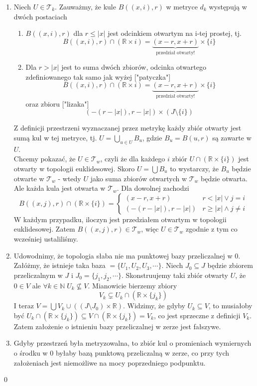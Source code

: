 \documentclass{article}
\theoremstyle{definition}%
\theoremstyle{theorem}
\renewenvironment{proof}{{\bfseries Rozwiązanie}}{\qed}
\newcommand{\R}{\mathbb{R}} %
\newcommand{\sT}{\mathcal{T}} %
\begin{document}
		 \begin{proof}
		 	\begin{enumerate}
		 		\item Niech $U \in \sT_k$. Zauważmy, że kule $B((x,i),r)$ w metryce $d_k$ występują w dwóch postaciach
		 		\begin{enumerate}
		 			\item $B((x,i),r)$ dla $r\leq|x|$ jest odcinkiem otwartym na i-tej prostej, tj. \[
		 			B((x,i),r) \cap \left(\R \times {i}\right) = \underbrace{(x-r,x+r)}_{\text{przedział otwarty!}} \times \{i\}\]
		 			\item Dla $r > |x|$ jest to suma dwóch zbiorów, odcinka otwartego zdefiniowanego tak samo jak wyżej ["patyczka"] 
		 			\[
		 			B((x,i),r) \cap \left(\R \times {i}\right) = \underbrace{(x-r,x+r)}_{\text{przedział otwarty!}} \times \{i\}\]
		 			oraz zbioru ["lizaka"]
		 			\[
		 			(-(r-|x|),r-|x|)\times \left(J \setminus \{i\}\right)
		 			\]
		 		\end{enumerate}
		 		Z definicji przestrzeni wyznaczanej przez metrykę każdy zbiór otwarty jest sumą kul w tej metryce, tj. $U=\bigcup_{u\in U } B_u$, gdzie $B_u = B(u,r)$ są zawarte w $U$. \\
		 		Chcemy pokazać, że $U\in \sT_w$, czyli że dla każdego $i$ zbiór $U\cap \left( \R\times\{i\}\right)$ jest otwarty w topologii euklidesowej. Skoro $U = \bigcup B_u$ to wystarczy, że $B_u$ będzie otwarte w $\sT_w$ - wtedy $U$ jako suma zbiorów otwartych w $\sT_w$ będzie otwarta. \\
		 		Ale każda kula jest otwarta w $\sT_w$. Dla dowolnej zachodzi 
		 		\[
		 		B((x,j),r) \cap \left(\R \times \{i\}\right) = \begin{cases}
		 		(x-r,x+r) & r < |x| \vee j = i \\
		 		(-(r-|x|),r-|x|) & r \geq |x| \wedge j \neq i
		 		
		 		\end{cases}
		 		\]
			 	W każdym przypadku, iloczyn jest przedziałem otwartym w topologii euklidesowej. Zatem $B((x,j),r) \in \sT_w$, więc $U\in \sT_w$ zgodnie z tym co wcześniej ustaliliśmy.
			 	\item 
		 		Udowodnimy, że topologia słaba nie ma punktowej bazy przeliczalnej w 0. \\
		 		Załóżmy, że istnieje taka baza $= \{U_1,U_2,U_3,\cdots\}$. Niech $J_0 \subseteq J$ będzie zbiorem przeliczalnym w $J$ i $J_0=\{j_1,j_2,\cdots\}$. Skonstruujemy taki zbiór otwarty $U$, że $0\in V$ ale $\forall k\in \mathbb{N} \; U_k \not\subseteq V$.
		 		Mianowicie bierzemy zbiory
		 		\[
		 		V_k \subsetneq U_k \cap \left(\R \times \{j_k\}\right)
		 		\]
		 		I teraz $V=\bigcup V_k \cup \left((J\setminus J_0)\times \R\right)$. Widzimy, że gdyby $U_k \subseteq V$, to musiałoby być $U_k\cap (\R \times \{j_k\}) \subseteq V \cap (\R \times \{j_k\}) = V_k$, co jest sprzeczne z definicji $V_k$. Zatem założenie o istnieniu bazy przeliczalnej w zerze jest fałszywe.
		 		\item
		 		Gdyby przestrzeń była metryzowalna, to zbiór kul o promieniach wymiernych o środku w 0 byłaby bazą punktową przeliczalną w zerze, co przy tych założeniach jest niemożliwe na mocy poprzedniego podpunktu.
		 	\end{enumerate}
		 	

\end{proof}
\end{document}
